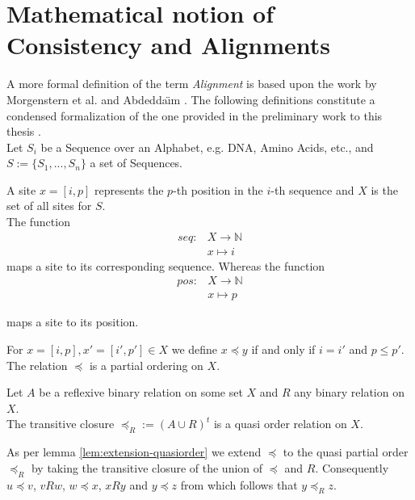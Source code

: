 \section{Mathematical notion of Consistency and Alignments}
A more formal definition of the term \textit{Alignment} is based upon the work by Morgenstern et al. \cite{morgenstern1996multiple} and Abdedda{\"\i}m \cite{abdeddaim2000speeding}. The following definitions constitute a condensed formalization of the one provided in the preliminary work to this thesis \cite{hundt2020praktkium}.\\ 

Let $S_i$ be a Sequence over an Alphabet, e.g. DNA, Amino Acids, etc., and $S := \{S_1, ..., S_n\}$ a set of Sequences.\\

\begin{mydef}[Site]
	A site $x = [i,p]$ represents the $p$-th position in the $i$-th sequence and $X$ is the set of all sites for $S$.\\
	The function 
	\begin{align*}
	seq: &X \rightarrow \mathbb{N}\\
	&x \mapsto i
	\end{align*}
	maps a site to its corresponding sequence. Whereas the function
	\begin{align*}
	pos: &X \rightarrow \mathbb{N}\\
	&x \mapsto p
	\end{align*}
\end{mydef}
maps a site to its position.
\begin{mydef}
	For $x = [i, p], x'=[i', p'] \in X$ we define $x \preceq y$ if and only if $i = i'$ and $p \leq p'$.\\
	The relation $\preceq$ is a partial ordering on $X$.
\end{mydef}


\begin{mylemma}
	Let $A$ be a reflexive binary relation on some set $X$ and $R$ any binary relation on $X$.\\
	The transitive closure $\preceq_R :=(A\cup R)^t$ is a quasi order relation on $X$.\\
	\label{lem:extension-quasiorder}
\end{mylemma}

As per lemma \ref{lem:extension-quasiorder} we extend $\preceq$ to the quasi partial order $\preceq_R$ by taking the transitive closure of the union of $\preceq$ and $R$. Consequently $u\preceq v$, $vRw$, $w\preceq x$, $xRy$ and $y\preceq z$ from which follows that $y \preceq_R z$.

